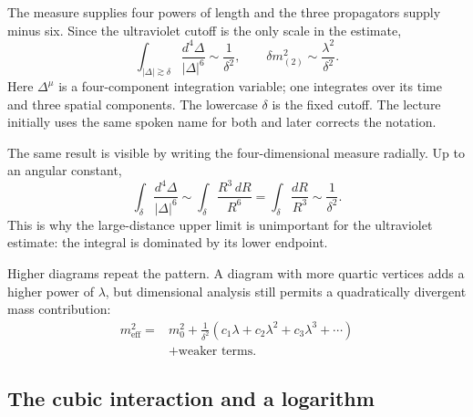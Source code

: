 \begin{classroomqa}
\end{classroomqa}

The measure supplies four powers of length and the three propagators supply
minus six. Since the ultraviolet cutoff is the only scale in the estimate,
\begin{equation}
\int_{|\Delta|\gtrsim\delta}
\frac{d^4\Delta}{|\Delta|^6}
\sim\frac{1}{\delta^2},
\qquad
\delta m^2_{(2)}
\sim\frac{\lambda^2}{\delta^2}.
\label{eq:two-loop-scalar-mass}
\end{equation}
Here \(\Delta^\mu\) is a four-component integration variable; one integrates
over its time and three spatial components. The lowercase \(\delta\) is the
fixed cutoff. The lecture initially uses the same spoken name for both and
later corrects the notation.

The same result is visible by writing the four-dimensional measure radially.
Up to an angular constant,
\begin{equation}
\int_{\delta}\frac{d^4\Delta}{|\Delta|^6}
\sim
\int_{\delta}\frac{R^3\,dR}{R^6}
=\int_{\delta}\frac{dR}{R^3}
\sim\frac{1}{\delta^2}.
\end{equation}
This is why the large-distance upper limit is unimportant for the ultraviolet
estimate: the integral is dominated by its lower endpoint.

Higher diagrams repeat the pattern. A diagram with more quartic vertices adds
a higher power of \(\lambda\), but dimensional analysis still permits a
quadratically divergent mass contribution:
\begin{equation}
\begin{aligned}
m_{\mathrm{eff}}^2
={}&m_0^2
+\frac{1}{\delta^2}
\left(c_1\lambda+c_2\lambda^2+c_3\lambda^3+\cdots\right)\\
&+\text{weaker terms}.
\end{aligned}
\label{eq:scalar-mass-series}
\end{equation}

\subsection{The cubic interaction and a logarithm}

